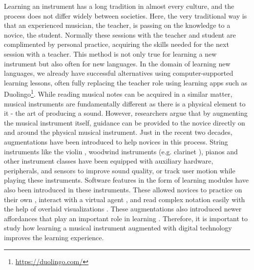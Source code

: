 \documentclass[sigchi, review]{acmart}
\begin{document}
Learning an instrument has a long tradition in almost every culture, and the process does not differ widely between societies. Here, the very traditional way is that an experienced musician, the teacher, is passing on the knowledge to a novice, the student. Normally these sessions with the teacher and student are complimented by personal practice, acquiring the skills needed for the next session with a teacher. This method is not only true for learning a new instrument but also often for new languages. In the domain of learning new languages, we already have successful alternatives using computer-supported learning lessons, often fully replacing the teacher role using learning apps such as Duolingo\footnote{\url{https://duolingo.com/}}. While reading musical notes can be acquired in a similar matter, musical instruments are fundamentally different as there is a physical element to it - the art of producing a sound. However, researchers argue that by augmenting the musical instrument itself, guidance can be provided to the novice directly on and around the physical musical instrument. Just in the recent two decades, augmentations have been introduced to help novices in this process. String instruments like the violin \cite{overholt2005overtone}, woodwind instruments (e.g. clarinet \cite{silva2008interaction}), pianos \cite{mcpherson2010augmenting} and other instrument classes \cite{turchet2018some, newton2011examining} have been equipped with auxiliary hardware, peripherals, and sensors to improve sound quality, or track user motion while playing these instruments. Software features in the form of learning modules have also been introduced in these instruments. These allowed novices to practice on their own \cite{fober2007vemus}, interact with a virtual agent \cite{costalonga2008agent, tidemann2009groovy}, and read complex notation easily with the help of overlaid visualizations \cite{trujano2018arpiano, gerry2019adept, santiniaugmented}. These augmentations also introduced newer affordances that play an important role in learning \cite{dede1996evolution}. Therefore, it is important to study how learning a musical instrument augmented with digital technology improves the learning experience.
\end{document}
